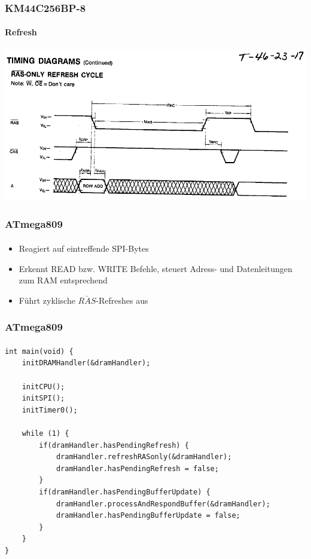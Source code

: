 \documentclass{beamer}
\begin{document}
\begin{frame}

	\frametitle{KM44C256BP-8}
	\framesubtitle{Refresh}
	\begin{center}
		\includegraphics[scale=0.35]{images/DRAM_Refresh_Cycle.png}
	\end{center}
	
\end{frame}

\begin{frame}

	\frametitle{ATmega809}
	\framesubtitle{}
	\begin{itemize}
		\item Reagiert auf eintreffende SPI-Bytes
		\item Erkennt READ bzw. WRITE Befehle, steuert Adress- und Datenleitungen zum RAM entsprechend
		\item Führt zyklische $\bar{RAS}$-Refreshes aus
	\end{itemize}
	
\end{frame}

\begin{frame}[containsverbatim]

	\frametitle{ATmega809}
	\framesubtitle{}
	\begin{lstlisting}[style=CStyle]
int main(void) {
	initDRAMHandler(&dramHandler);

	initCPU();
	initSPI();
	initTimer0();
	
	while (1) {
		if(dramHandler.hasPendingRefresh) {
			dramHandler.refreshRASonly(&dramHandler);
			dramHandler.hasPendingRefresh = false;
		}
		if(dramHandler.hasPendingBufferUpdate) {
			dramHandler.processAndRespondBuffer(&dramHandler);
			dramHandler.hasPendingBufferUpdate = false;
		}
	}
}
	\end{lstlisting}
	
\end{frame}
\end{document}
